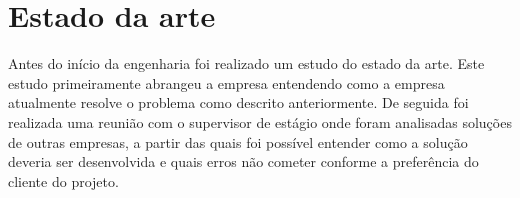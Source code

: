 \section{Estado da arte}

Antes do início da engenharia foi realizado um estudo do estado da arte. Este estudo primeiramente 
abrangeu a empresa entendendo como a empresa atualmente resolve o problema como descrito anteriormente. 
De seguida foi realizada uma reunião com o supervisor de estágio onde foram analisadas soluções de outras 
empresas, a partir das quais foi possível entender como a solução deveria ser desenvolvida e quais erros 
não cometer conforme a preferência do cliente do projeto.